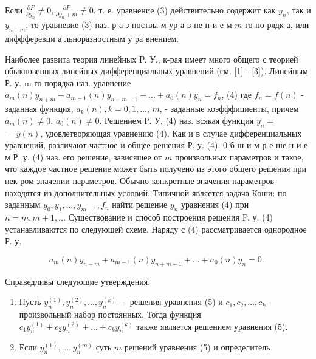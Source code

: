 \documentclass[10pt]{article}
\begin{document}
Если $\frac{\partial F}{\partial y_{n}} \neq 0, \frac{\partial F}{\partial y_{n}+m} \neq 0$, т. е. уравнение (3) действительно содержит как $y_{n}$, так и $y_{n+m}$, то уравневие (3) наз. р а з ноствы м ур а в не н и е м $m$-го по рядк а, или диффферевци а льноразностным у ра внением.



Наиболее развита теория линейных P. У., к-рая имеет много общего с теорией обыкновенных линейных дифференциальных уравнений (см. [1] - [3]). Линейным Р. у. m-го порядка наз. уравнение $a_{m}(n) y_{n+m}+a_{m-1}(n) y_{n+m-1}+\ldots+a_{0}(n) y_{n}=f_{n}$, (4) где $f_{n}=f(n)$ - заданная функция, $a_{k}(n), k=0,1, \ldots$, $m$, - заданные коэфффициенты, причем $a_{m}(n) \neq 0$, $a_{0}(n) \neq 0$. Решением Р. У. (4) наз. всякая функция $y_{n}=$ $=y(n)$, удовлетворяющая уравнению (4). Как и в случае дифференциальных уравнений, различают частное и общее решения Р. у. (4). 0 б ш и м р е ше н и е м Р. у. (4) наз. его решение, зависящее от $m$ произвольных параметров и такое, что каждое частное решение может быть получено из этого общего решения при нек-ром значении параметров. Обычно конкретные значения параметров находятся из дополнительных условий. Типичной является задача Коши: по заданным $y_{0}, y_{1}, \ldots, y_{m-1}, f_{n}$ найти решение $y_{n}$ уравнения (4) при $n=m, m+1, \ldots$ Существование и способ построения решения P. у. (4) устанавливаются по следующей схеме. Наряду с (4) рассматривается однородное Р. у.



\[

a_{m}(n) y_{n+m}+a_{m-1}(n) y_{n+m-1}+\ldots+a_{0}(n) y_{n}=0 \text {. }

\]



Справедливы следующие утверждения.



\begin{enumerate}

  \item Пусть $y_{n}^{(1)}, y_{n}^{(2)}, \ldots, y_{n}^{(k)}-$ решения уравнения (5) и $c_{1}, c_{2}, \ldots, c_{k}$ - произвольный набор постоянных. Тогда функция $c_{1} y_{n}^{(1)}+c_{2} y_{n}^{(2)}+\ldots+c_{k} y_{n}^{(k)}$ также является решением уравнения (5).



  \item Если $y_{n}^{(1)}, \ldots, y_{n}^{(m)}$ суть $m$ решений уравнения (5) и определитель



\end{enumerate}
\end{document}
